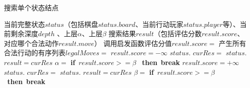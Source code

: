 \documentclass{acm_proc_article-sp}
\begin{document}
\begin{algorithm}
       \algsetup{\tiny}
       \scriptsize
       \caption{搜索单个状态结点}
       \begin{algorithmic}[1] %
              \Require 当前完整状态$status$（包括棋盘$status.board$、当前行动玩家$status.player$等）、当前剩余深度$depth$
              、上层$\alpha$、上层$\beta$
              \Ensure 搜索结果$result$（包括评估分数$result.score$、对应哪个合法动作$result.move$）
              \State 调用启发函数评估分值$result.score = $
              \State {}
              \EndIf
              \State 产生所有合法行动的有序列表$legalMoves = $
                     \State $result.score = -\infty$
                            \State $status.$
                            \State $curRes = $ 
                            \State $status.$
                                   \State $result = curRes$
                                   \State $\alpha = $ 
                            \EndIf
                            \State \textbf{if}\ {$result.score >= \beta$} \ \textbf{then}\ \textbf{break}
                     \EndFor
              \EndIf
                     \State $result.score = +\infty$
                            \State $status.$
                            \State $curRes = $ 
                            \State $status.$
                                   \State $result = curRes$
                                   \State $\beta = $ 
                            \EndIf
                            \State \textbf{if}\ {$result.score >= \beta$} \ \textbf{then}\ \textbf{break}
                     \EndFor
              \EndIf
              \State {}
              \EndFunction
       \end{algorithmic}
\end{algorithm}
\end{document}
